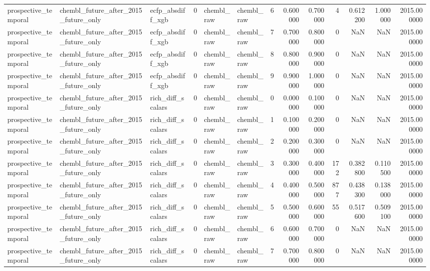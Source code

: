 \begin{longtable}{lllrllrrrrrrr}
prospective\_temporal & chembl\_future\_after\_2015\_future\_only & ecfp\_absdiff\_xgb & 0 & chembl\_raw & chembl\_raw & 6 & 0.600000 & 0.700000 & 4 & 0.612200 & 1.000000 & 2015.000000 \\
prospective\_temporal & chembl\_future\_after\_2015\_future\_only & ecfp\_absdiff\_xgb & 0 & chembl\_raw & chembl\_raw & 7 & 0.700000 & 0.800000 & 0 & NaN & NaN & 2015.000000 \\
prospective\_temporal & chembl\_future\_after\_2015\_future\_only & ecfp\_absdiff\_xgb & 0 & chembl\_raw & chembl\_raw & 8 & 0.800000 & 0.900000 & 0 & NaN & NaN & 2015.000000 \\
prospective\_temporal & chembl\_future\_after\_2015\_future\_only & ecfp\_absdiff\_xgb & 0 & chembl\_raw & chembl\_raw & 9 & 0.900000 & 1.000000 & 0 & NaN & NaN & 2015.000000 \\
prospective\_temporal & chembl\_future\_after\_2015\_future\_only & rich\_diff\_scalars & 0 & chembl\_raw & chembl\_raw & 0 & 0.000000 & 0.100000 & 0 & NaN & NaN & 2015.000000 \\
prospective\_temporal & chembl\_future\_after\_2015\_future\_only & rich\_diff\_scalars & 0 & chembl\_raw & chembl\_raw & 1 & 0.100000 & 0.200000 & 0 & NaN & NaN & 2015.000000 \\
prospective\_temporal & chembl\_future\_after\_2015\_future\_only & rich\_diff\_scalars & 0 & chembl\_raw & chembl\_raw & 2 & 0.200000 & 0.300000 & 0 & NaN & NaN & 2015.000000 \\
prospective\_temporal & chembl\_future\_after\_2015\_future\_only & rich\_diff\_scalars & 0 & chembl\_raw & chembl\_raw & 3 & 0.300000 & 0.400000 & 172 & 0.382800 & 0.110500 & 2015.000000 \\
prospective\_temporal & chembl\_future\_after\_2015\_future\_only & rich\_diff\_scalars & 0 & chembl\_raw & chembl\_raw & 4 & 0.400000 & 0.500000 & 877 & 0.438300 & 0.138000 & 2015.000000 \\
prospective\_temporal & chembl\_future\_after\_2015\_future\_only & rich\_diff\_scalars & 0 & chembl\_raw & chembl\_raw & 5 & 0.500000 & 0.600000 & 55 & 0.517600 & 0.509100 & 2015.000000 \\
prospective\_temporal & chembl\_future\_after\_2015\_future\_only & rich\_diff\_scalars & 0 & chembl\_raw & chembl\_raw & 6 & 0.600000 & 0.700000 & 0 & NaN & NaN & 2015.000000 \\
prospective\_temporal & chembl\_future\_after\_2015\_future\_only & rich\_diff\_scalars & 0 & chembl\_raw & chembl\_raw & 7 & 0.700000 & 0.800000 & 0 & NaN & NaN & 2015.000000 \\

\end{longtable}
